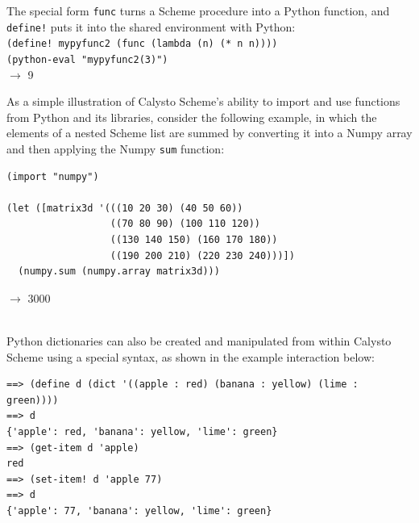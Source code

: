 \documentclass[acmsmall,screen,authorversion]{acmart}
\begin{document}
\noindent
The special form \texttt{func} turns a Scheme procedure into a Python function,
and \texttt{define!} puts it into the shared environment with Python:\\

{\footnotesize
\noindent
\texttt{(define! mypyfunc2 (func (lambda (n) (* n n))))}\\
\texttt{(python-eval "mypyfunc2(3)")}\\
$\rightarrow$ 9\\
}

\noindent
As a simple illustration of Calysto Scheme's ability to import and use
functions from Python and its libraries, consider the following example, in
which the elements of a nested Scheme list are summed by converting it into a
Numpy array and then applying the Numpy \texttt{sum} function:\\

\begin{minipage}{\textwidth}
{\footnotesize
\begin{verbatim}
(import "numpy")

(let ([matrix3d '(((10 20 30) (40 50 60))
                  ((70 80 90) (100 110 120))
                  ((130 140 150) (160 170 180))
                  ((190 200 210) (220 230 240)))])
  (numpy.sum (numpy.array matrix3d)))
\end{verbatim}
$\rightarrow$ 3000
}
\end{minipage}\\

\noindent
Python dictionaries can also be created and manipulated from within Calysto
Scheme using a special syntax, as shown in the example interaction below:\\

\begin{minipage}{\textwidth}
{\footnotesize
\begin{verbatim}
==> (define d (dict '((apple : red) (banana : yellow) (lime : green))))
==> d
{'apple': red, 'banana': yellow, 'lime': green}
==> (get-item d 'apple)
red
==> (set-item! d 'apple 77)
==> d
{'apple': 77, 'banana': yellow, 'lime': green}
\end{verbatim}
}
\end{minipage}

\end{document}

